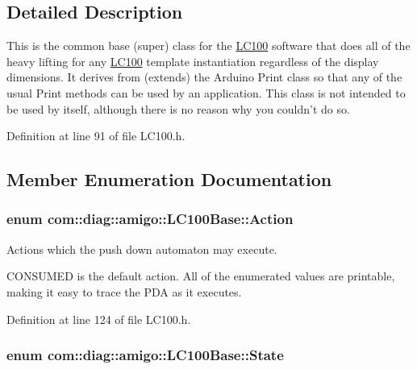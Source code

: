 \subsection{Detailed Description}
This is the common base (super) class for the \hyperlink{classcom_1_1diag_1_1amigo_1_1LC100}{LC100} software that does all of the heavy lifting for any \hyperlink{classcom_1_1diag_1_1amigo_1_1LC100}{LC100} template instantiation regardless of the display dimensions. It derives from (extends) the Arduino Print class so that any of the usual Print methods can be used by an application. This class is not intended to be used by itself, although there is no reason why you couldn't do so. 

Definition at line 91 of file LC100.h.



\subsection{Member Enumeration Documentation}
\hypertarget{classcom_1_1diag_1_1amigo_1_1LC100Base_afa1217f48472f7f6758733208ad14125}{
\subsubsection[{Action}]{\setlength{\rightskip}{0pt plus 5cm}enum {\bf com::diag::amigo::LC100Base::Action}}}
\label{classcom_1_1diag_1_1amigo_1_1LC100Base_afa1217f48472f7f6758733208ad14125}


Actions which the push down automaton may execute. 

CONSUMED is the default action. All of the enumerated values are printable, making it easy to trace the PDA as it executes. 

Definition at line 124 of file LC100.h.

\hypertarget{classcom_1_1diag_1_1amigo_1_1LC100Base_a13ddf5295a1d05a7d2d939941ba7266e}{
\subsubsection[{State}]{\setlength{\rightskip}{0pt plus 5cm}enum {\bf com::diag::amigo::LC100Base::State}}}
\label{classcom_1_1diag_1_1amigo_1_1LC100Base_a13ddf5295a1d05a7d2d939941ba7266e}


